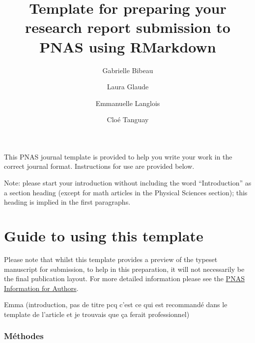\documentclass[9pt,twocolumn,twoside,]{pnas-new}
\title{Template for preparing your research report submission to PNAS
using RMarkdown}
\author[a,1]{Gabrielle Bibeau}
\author[a]{Laura Glaude}
\author[a]{Emmanuelle Langlois}
\author[a]{Cloé Tanguay}
\affil[a]{Université de Sherbrooke, Département de Biologie, 2500
Boulevard de l'Université, Sherbrooke, Québec, Canada}
\begin{document}
\verticaladjustment{-2pt}



\maketitle
\thispagestyle{firststyle}



This PNAS journal template is provided to help you write your work in
the correct journal format. Instructions for use are provided below.

Note: please start your introduction without including the word
``Introduction'' as a section heading (except for math articles in the
Physical Sciences section); this heading is implied in the first
paragraphs.

\hypertarget{guide-to-using-this-template}{%
\section*{Guide to using this
template}\label{guide-to-using-this-template}}

Please note that whilst this template provides a preview of the typeset
manuscript for submission, to help in this preparation, it will not
necessarily be the final publication layout. For more detailed
information please see the
\href{http://www.pnas.org/site/authors/format.xhtml}{PNAS Information
for Authors}.

Emma (introduction, pas de titre pcq c'est ce qui est recommandé dans le
template de l'article et je trouvais que ça ferait professionnel)

\hypertarget{muxe9thodes}{%
\subsubsection*{Méthodes}\label{muxe9thodes}}
\end{document}
